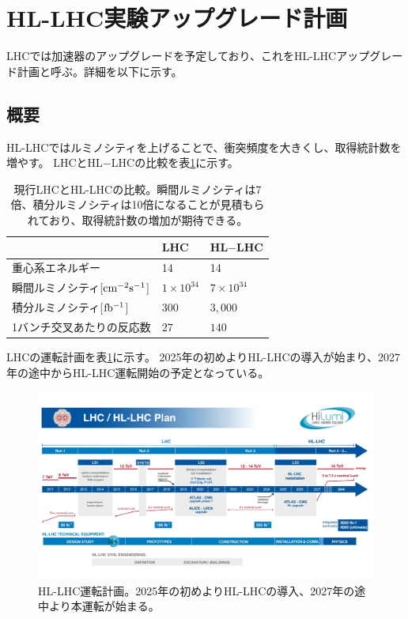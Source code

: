 \clearpage
\section{HL-LHC実験アップグレード計画}
LHCでは加速器のアップグレードを予定しており、これをHL-LHCアップグレード計画と呼ぶ。詳細を以下に示す。
\subsection{概要}
HL-LHCではルミノシティ\cite{1-13}を上げることで、衝突頻度を大きくし、取得統計数を増やす。
LHCとHL$-$LHCの比較を表\ref{compare_lhc}に示す。

\begin{table}[tbp]
\begin{center}
\caption[現行LHCとHL-LHCの比較]{現行LHCとHL-LHCの比較\cite{1-6}。瞬間ルミノシティは7倍、積分ルミノシティは10倍になることが見積もられており、取得統計数の増加が期待できる。}
\label{compare_lhc}
  \begin{tabular}{|lll|} \hline
    & LHC & HL$-$LHC \\ \hline
    重心系エネルギー & 14 & 14 \\
    瞬間ルミノシティ[$\rm{cm^{-2}s^{-1}}$] & $1\times 10^{34}$ & $7\times10^{34}$ \\
    積分ルミノシティ[$\rm{fb^{-1}}$] & $300$ & $3,000$ \\
    1バンチ交叉あたりの反応数 & $27$ & $140$ \\ \hline 
  \end{tabular}
\end{center}
\end{table}

LHCの運転計画を表\ref{hllhc_plan}に示す。
2025年の初めよりHL-LHCの導入が始まり、2027年の途中からHL-LHC運転開始の予定となっている。
\begin{figure}[bpt]\centering
\includegraphics[width=12cm]{./hllhc_plan.jpg}
\caption[HL-LHC運転計画]{HL-LHC運転計画\cite{1-7}。2025年の初めよりHL-LHCの導入、2027年の途中より本運転が始まる。}
\label{hllhc_plan}
\end{figure}

